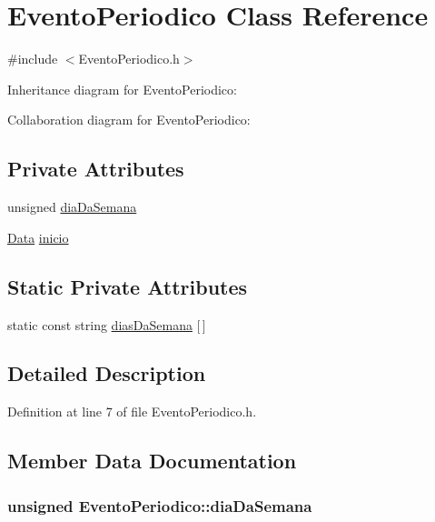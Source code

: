 \hypertarget{class_evento_periodico}{\section{Evento\+Periodico Class Reference}
\label{class_evento_periodico}
}


{\ttfamily \#include $<$Evento\+Periodico.\+h$>$}



Inheritance diagram for Evento\+Periodico\+:


Collaboration diagram for Evento\+Periodico\+:
\subsection*{Private Attributes}
\begin{DoxyCompactItemize}
\item 
unsigned \hyperlink{class_evento_periodico_ab9b475ada052493882fa156c9bbda446}{dia\+Da\+Semana}
\item 
\hyperlink{class_data}{Data} \hyperlink{class_evento_periodico_a2ae3543393734dffa1d4d5e36484132e}{inicio}
\end{DoxyCompactItemize}
\subsection*{Static Private Attributes}
\begin{DoxyCompactItemize}
\item 
static const string \hyperlink{class_evento_periodico_a65e4d98dbe59d5f63b67efdd4a350c16}{dias\+Da\+Semana} \mbox{[}$\,$\mbox{]}
\end{DoxyCompactItemize}


\subsection{Detailed Description}


Definition at line 7 of file Evento\+Periodico.\+h.



\subsection{Member Data Documentation}
\hypertarget{class_evento_periodico_ab9b475ada052493882fa156c9bbda446}{
\subsubsection[{dia\+Da\+Semana}]{\setlength{\rightskip}{0pt plus 5cm}unsigned Evento\+Periodico\+::dia\+Da\+Semana\hspace{0.3cm}{\ttfamily [private]}}}\label{class_evento_periodico_ab9b475ada052493882fa156c9bbda446}


